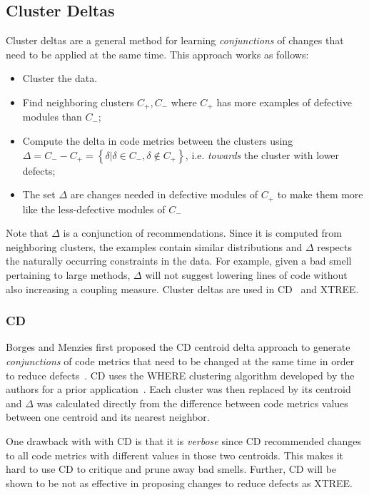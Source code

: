 \documentclass[twocolumn,5p]{elsarticle}
\theoremstyle{break}
\begin{document}
	
	\subsection{Cluster Deltas}
	
	Cluster deltas are a general method
	for learning {\em conjunctions} of changes
	that need to be applied at the same time. 
	This approach works as follows:
	\begin{itemize}
		\item Cluster the data. 
		\item Find
		neighboring clusters $C_+,C_-$ where $C_+$ has more examples of defective
		modules than $C_-$;
		\item Compute the  delta   in code metrics between the clusters using \mbox{$\Delta = C_- - C_+ = \left\{\delta|\delta\in C_-, \delta \notin C_+\right\}$}, i.e.
		{\em towards} the cluster with lower defects;
		\item The set $\Delta$ are changes needed in defective modules of $C_+$ to
		make them more like the less-defective modules of $C_-$
	\end{itemize}
	Note that $\Delta$ is a conjunction of  recommendations.
	Since it is computed
	from neighboring clusters, the examples contain similar distributions and $\Delta$ respects the naturally occurring constraints in the data. For example,
	given a bad smell pertaining to large methods,   $\Delta$   will not  suggest lowering lines of code
	without also increasing a coupling measure. 
	Cluster deltas are used in CD~\cite{me12c} and XTREE.
	
	
	
	\subsubsection{CD}\label{sec:cdcd}
	Borges and Menzies first proposed the CD centroid delta approach to
	generate {\em conjunctions} of code metrics
	that need to be changed at the same time
	in order to reduce defects~\cite{me12c}.
	CD uses the WHERE clustering algorithm developed by the
	authors for a prior application~\cite{localvsglobal}.
	Each cluster was then replaced by its centroid
	and $\Delta$ was calculated directly from the difference
	between code metrics values between one centroid
	and its nearest neighbor.
	
	
	One drawback with with CD is that it is {\em verbose}
	since
	CD   recommended changes to all code
	metrics with different values in those two centroids. 
	This makes it hard to use CD to   critique and prune away bad smells. Further, CD will be shown to be
	not as effective
	in proposing changes to reduce defects as XTREE.
	
\end{document}
